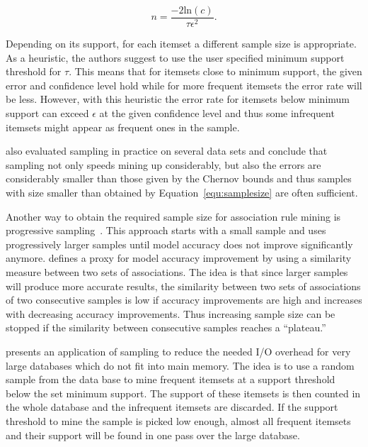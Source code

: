 \documentclass[10pt,a4paper]{article}
\begin{document}
\begin{equation}
n = \frac{-2\mathrm{ln}(c)}{\tau\epsilon^2}.
\label{equ:samplesize}
\end{equation}

Depending on its support, for each itemset a different sample size is
appropriate.  As a heuristic, the authors suggest to use the user
specified minimum support threshold for $\tau$.  This means that for
itemsets close to minimum support, the given error and confidence level
hold while for more frequent itemsets the error rate will be less.
However, with this heuristic the error rate for itemsets below minimum
support can exceed $\epsilon$ at the given confidence level and thus
some infrequent itemsets might appear as frequent ones in the sample.

\cite{arules:Zaki+Parthasarathy+Li+Ogihara:1997} also evaluated sampling
in practice on several data sets and conclude that sampling not only
speeds mining up considerably, but also the errors are considerably
smaller than those given by the Chernov bounds and thus samples with
size smaller than obtained by Equation~\ref{equ:samplesize} are often
sufficient.

Another way to obtain the required sample size 
for association rule mining is progressive 
sampling~\citep{arules:Parthasarathy:2002}.
This approach starts with a small sample and uses progressively larger 
samples until model accuracy does not improve significantly anymore. 
\cite{arules:Parthasarathy:2002} defines a proxy for 
model accuracy improvement by using a similarity measure between two
sets of associations. The idea is that 
since larger samples will produce more accurate results, the
similarity between two sets of associations of two consecutive samples
is low if accuracy improvements are high and increases with
decreasing accuracy improvements.
Thus increasing sample size can be stopped if the similarity
between consecutive samples reaches a ``plateau.'' 

\cite{arules:Toivonen:1996} presents an application of sampling to reduce
the needed I/O overhead for very large databases which do not fit into 
main memory.
The idea is to use a random sample from the data base to mine
frequent itemsets at a support threshold below the set minimum support.
The support of these itemsets is then counted in the whole database 
and the infrequent itemsets are discarded. 
If the support threshold to mine the sample is picked low enough, 
almost all frequent itemsets and their support will be found
in one pass over the large database.
\end{document}
